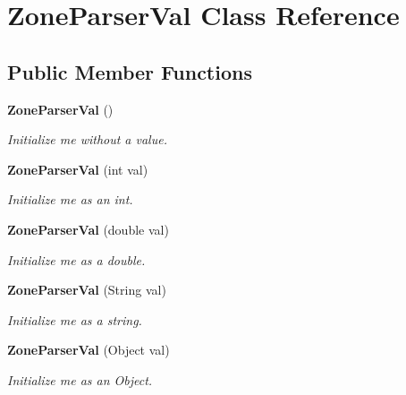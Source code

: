\section{Zone\-Parser\-Val Class Reference}
\label{classorg_1_1smallfoot_1_1parser_1_1zone_1_1ZoneParserVal}
\subsection*{Public Member Functions}
\begin{DoxyCompactItemize}
\item 
{\bf Zone\-Parser\-Val} ()
\begin{DoxyCompactList}\small\item\em Initialize me without a value. \end{DoxyCompactList}\item 
{\bf Zone\-Parser\-Val} (int val)
\begin{DoxyCompactList}\small\item\em Initialize me as an int. \end{DoxyCompactList}\item 
{\bf Zone\-Parser\-Val} (double val)
\begin{DoxyCompactList}\small\item\em Initialize me as a double. \end{DoxyCompactList}\item 
{\bf Zone\-Parser\-Val} (String val)
\begin{DoxyCompactList}\small\item\em Initialize me as a string. \end{DoxyCompactList}\item 
{\bf Zone\-Parser\-Val} (Object val)
\begin{DoxyCompactList}\small\item\em Initialize me as an Object. \end{DoxyCompactList}\end{DoxyCompactItemize}

